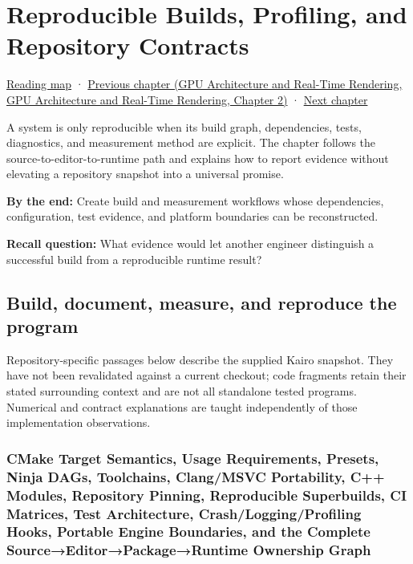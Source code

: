 \hypertarget{01-foundations-i-ch010}{}
\chapter{Reproducible Builds, Profiling, and Repository Contracts}\label{stagechapter:01-foundations-i-ch010}\label{01-foundations-i-ch010-reproducible-builds-profiling-and-repository-contracts}

\hyperref[volume-reading-map]{Reading map} · \href{../06-GPU-Architecture-and-Real-Time-Rendering/main.pdf\#nameddest=01-foundations-i-ch009-gpu-memory-divergence-atomics-and-ordering}{Previous chapter (GPU Architecture and Real-Time Rendering, GPU Architecture and Real-Time Rendering, Chapter 2)} · \hyperref[01-foundations-i-ch011-c-const-borrowing-and-cpugpu-buffering]{Next chapter}

A system is only reproducible when its build graph, dependencies, tests, diagnostics, and measurement method are explicit. The chapter follows the source-to-editor-to-runtime path and explains how to report evidence without elevating a repository snapshot into a universal promise.

\textbf{By the end:} Create build and measurement workflows whose dependencies, configuration, test evidence, and platform boundaries can be reconstructed.

\textbf{Recall question:} What evidence would let another engineer distinguish a successful build from a reproducible runtime result?

\section{Build, document, measure, and reproduce the program}\label{01-foundations-i-ch010-build-document-measure-and-reproduce-the-program}

Repository-specific passages below describe the supplied Kairo snapshot. They have not been revalidated against a current checkout; code fragments retain their stated surrounding context and are not all standalone tested programs. Numerical and contract explanations are taught independently of those implementation observations.

\subsection{CMake Target Semantics, Usage Requirements, Presets, Ninja DAGs, Toolchains, Clang/MSVC Portability, C++ Modules, Repository Pinning, Reproducible Superbuilds, CI Matrices, Test Architecture, Crash/Logging/Profiling Hooks, Portable Engine Boundaries, and the Complete Source→Editor→Package→Runtime Ownership Graph}\label{01-foundations-i-ch010-cmake-target-semantics-usage-requirements-presets-ninja-dags-toolchains-clangmsvc-portability-c-modules-repository-pinning-reproducible-superbuilds-ci-matrices-test-architecture-crashloggingprofiling-hooks-portable-engine-boundaries-and-the-complete-sourceeditorpackageruntime-ownership-graph}

